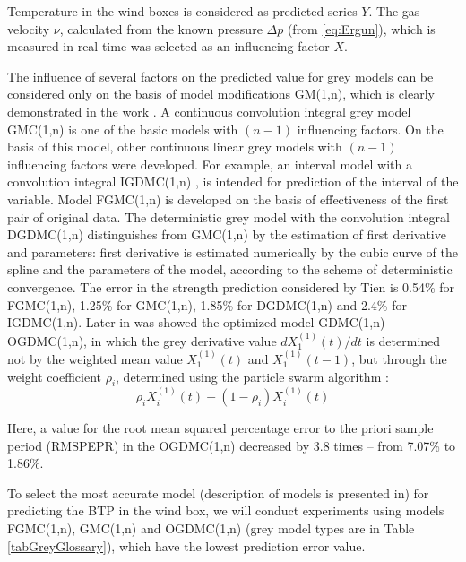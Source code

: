 \documentclass[AMS,STIX2COL]{WileyNJD-v2}
\begin{document}
Temperature in the wind boxes is considered as predicted series $Y$. The gas velocity $\nu$, calculated from the known pressure $\Delta p$ (from \eqref{eq:Ergun}), which is measured in real time was selected as an influencing factor $X$.

The influence of several factors on the predicted value for grey models can be considered only on the basis of model modifications GM(1,n), which is clearly demonstrated in the work \cite{Tien2008}. A continuous convolution integral grey model GMC(1,n) \cite{Kaymak2017} is one of the basic models with $(n-1)$ influencing factors. On the basis of this model, other continuous linear grey models with $(n-1)$ influencing factors were developed. For example, an interval model with a convolution integral IGDMC(1,n) \cite{Tien2008}, is intended for prediction of the interval of the variable. Model FGMC(1,n) \cite{Tien2011}  is developed on the basis of effectiveness of the first pair of original data. The deterministic grey model with the convolution integral DGDMC(1,n) \cite{Tien2009} distinguishes from GMC(1,n) by the estimation of first derivative and parameters: first derivative is estimated numerically by the cubic curve of the spline and the parameters of the model, according to the scheme of deterministic convergence. The error in the strength prediction considered by Tien is 0.54\% for FGMC(1,n), 1.25\% for GMC(1,n), 1.85\% for DGDMC(1,n) and 2.4\% for IGDMC(1,n). Later in \cite{Wang2014} was showed the optimized model GDMC(1,n) \cite{Tien2011} – OGDMC(1,n), in which the grey derivative value $dX_1^{(1)}(t)/dt$ is determined not by the weighted mean value $X_1^{(1)}(t)$ and $X_1^{(1)}(t-1)$,  but through the weight coefficient $\rho_i$, determined using the particle swarm algorithm \cite{Kennedy1995}:
\begin{equation}
\rho_iX_i^{(1)}(t)+(1-\rho_i)X_i^{(1)}(t)
\end{equation} 

Here, a value for the root mean squared percentage error to the priori sample period (RMSPEPR) in the OGDMC(1,n) decreased by 3.8 times – from 7.07\% to 1.86\%.

To select the most accurate model (description of models is presented in) for predicting the BTP in the wind box, we will conduct experiments using models FGMC(1,n), GMC(1,n) and OGDMC(1,n) (grey model types are in Table \ref{tabGreyGlossary}), which have the lowest prediction error value.
\end{document}
